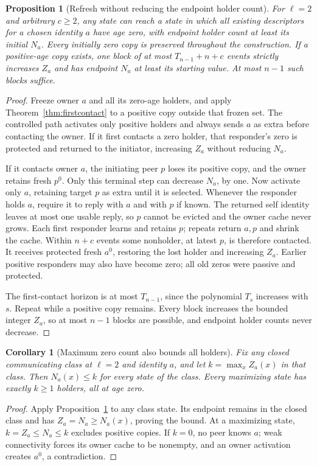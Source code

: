 \documentclass[11pt]{article}
\newtheorem{proposition}[theorem]{Proposition}
\newtheorem{corollary}[theorem]{Corollary}
\begin{document}
\begin{proposition}[Refresh without reducing the endpoint holder count]
\label{prop:zeroify}
For $\ell=2$ and arbitrary $c\ge2$, any state can reach
a state in which all existing descriptors for a chosen
identity $a$ have age zero, with endpoint holder count
at least its initial $N_a$. Every initially zero copy
is preserved throughout the construction.
If a positive-age copy exists, one block of at most
$T_{n-1}+n+c$ events strictly increases $Z_a$ and has
endpoint $N_a$ at least its starting value. At most
$n-1$ such blocks suffice.
\end{proposition}
\begin{proof}
Freeze owner $a$ and all its zero-age holders, and apply
Theorem~\ref{thm:firstcontact} to a positive copy outside
that frozen set. The controlled path activates only
positive holders and always sends $a$ as extra before
contacting the owner. If it first contacts a zero holder,
that responder's zero is protected and returned to the
initiator, increasing $Z_a$ without reducing $N_a$.

If it contacts owner $a$, the initiating peer $p$ loses
its positive copy, and the owner retains fresh $p^0$.
Only this terminal step can decrease $N_a$, by one.
Now activate only $a$, retaining target $p$ as extra
until it is selected. Whenever the responder holds $a$,
require it to reply with $a$ and with $p$ if known.
The returned self identity leaves at most one usable
reply, so $p$ cannot be evicted and the owner cache
never grows. Each first responder learns and retains
$p$; repeats return $a,p$ and shrink the cache.
Within $n+c$ events some nonholder, at latest $p$, is
therefore contacted. It receives protected fresh $a^0$,
restoring the lost holder and increasing $Z_a$.
Earlier positive responders may also have become zero;
all old zeros were passive and protected.

The first-contact horizon is at most $T_{n-1}$, since
the polynomial $T_s$ increases with $s$. Repeat while
a positive copy remains. Every block increases the
bounded integer $Z_a$, so at most $n-1$ blocks are
possible, and endpoint holder counts never decrease.
\end{proof}

\begin{corollary}[Maximum zero count also bounds all holders]
\label{cor:maxholders}
Fix any closed communicating class at $\ell=2$ and
identity $a$, and let $k=\max_x Z_a(x)$ in that class.
Then $N_a(x)\le k$ for every state of the class.
Every maximizing state has exactly $k\ge1$ holders,
all at age zero.
\end{corollary}
\begin{proof}
Apply Proposition~\ref{prop:zeroify} to any class state.
Its endpoint remains in the closed class and has
$Z_a=N_a\ge N_a(x)$, proving the bound.
At a maximizing state, $k=Z_a\le N_a\le k$ excludes
positive copies. If $k=0$, no peer knows $a$; weak
connectivity forces its owner cache to be nonempty,
and an owner activation creates $a^0$, a contradiction.
\end{proof}
\end{document}

